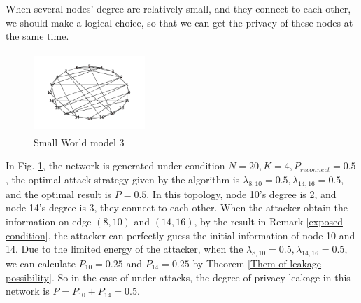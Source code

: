 \documentclass[10pt,journal,compsoc]{IEEEtran}
\begin{document}
When several nodes' degree are relatively small, and they connect to each other, we should make a logical choice, so that we can get the privacy of these nodes at the same time.
\begin{figure}[!htb]
 \parbox[b]{.5\textwidth}{\centering
 \includegraphics[width=4.2cm, height = 3.0cm]{k4p5-b}}
 \caption{Small World model 3}
 \label{figSW3}
\end{figure}

In Fig. \ref{figSW3}, the network is generated under condition $N=20,K=4,P_{reconnect}=0.5$, the optimal attack strategy given by the algorithm is $\lambda_{8,10}=0.5,\lambda_{14,16}=0.5$, and the optimal result is $P=0.5$. In this topology, node 10's degree is 2, and node 14's degree is 3, they connect to each other. When the attacker obtain the information on edge $(8,10)$ and $(14,16)$, by the result in Remark \ref{exposed condition}, the attacker can perfectly guess the initial information of node 10 and 14. Due to the limited energy of the attacker, when the $\lambda_{8,10} = 0.5,\lambda_{14,16}=0.5$, we can calculate $P_{10}=0.25$ and $P_{14}=0.25$ by Theorem \ref{Them of leakage possibility}. So in the case of under attacks, the degree of privacy leakage in this network is $P = P_{10}+P_{14}=0.5$.
\end{document}
